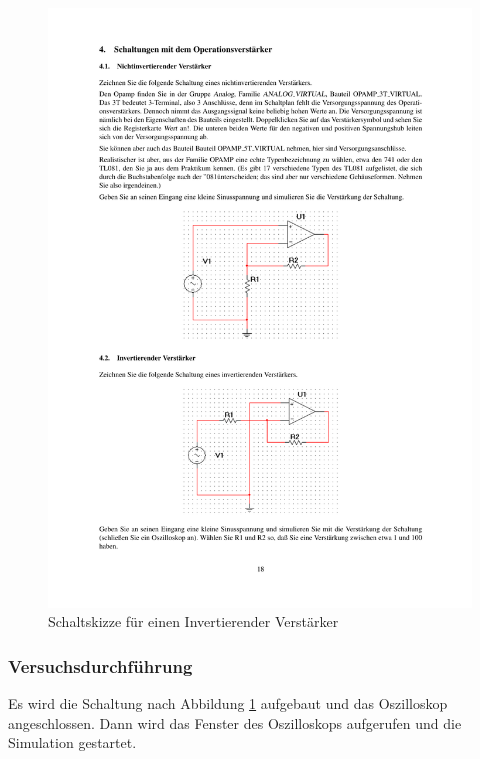 \documentclass[12pt,a4paper]{article}
\begin{document}
\begin{figure}[H] 
  \centering
    \includegraphics[trim = 10mm 45mm 10mm 190mm, clip, scale = 1]{ep5_14[Page18].pdf}
  	\caption[Schaltskizze für einen Invertierender Verstärker]{Schaltskizze für einen Invertierender Verstärker\footnotemark}
  \label{fig:4_a_2}
\end{figure}

\subsubsection{Versuchsdurchführung}

Es wird die Schaltung nach Abbildung \ref{fig:4_a_2} aufgebaut und das Oszilloskop angeschlossen. Dann wird das Fenster des Oszilloskops aufgerufen und die Simulation gestartet. 
\end{document}
